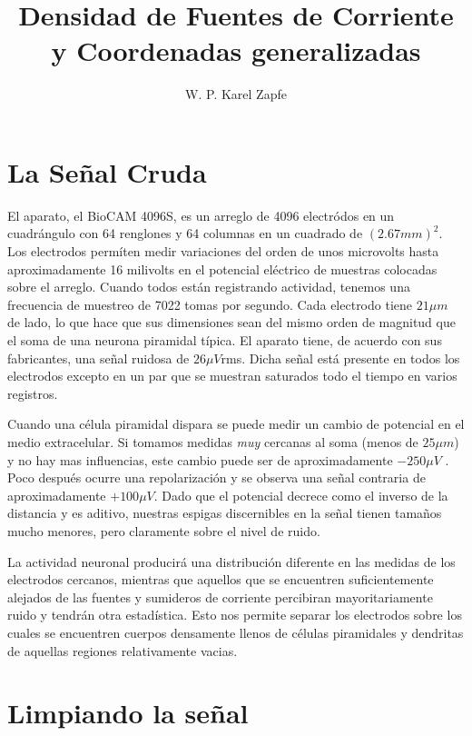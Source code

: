 \documentclass{article}
\title{Densidad de Fuentes de Corriente y Coordenadas generalizadas}
\author{W. P. Karel Zapfe}
\begin{document}
\maketitle

\section{La Señal Cruda}

El aparato, el BioCAM 4096S, es un arreglo de 4096 electródos en un 
cuadrángulo con 64 renglones y 64 columnas en un cuadrado de
$(2.67 mm)^2$. Los electrodos permíten medir variaciones del orden
de unos microvolts hasta aproximadamente 16 milivolts 
en el potencial eléctrico de muestras colocadas sobre el arreglo. Cuando
todos están registrando actividad, tenemos una frecuencia de muestreo
de 7022 tomas por segundo. Cada electrodo tiene $21 \mu m$ de lado, lo
que hace que sus dimensiones sean del mismo orden de magnitud que el 
soma de una neurona piramidal típica. El aparato tiene, de acuerdo
con sus fabricantes, una señal ruidosa de $26 \mu V$rms. Dicha señal
está presente en todos los electrodos excepto en un par que se
muestran saturados todo el tiempo en varios registros.

Cuando una célula piramidal dispara se puede medir un cambio de potencial
en el medio extracelular. Si tomamos medidas \emph{muy} cercanas al soma
(menos de $25 \mu m$)
y no hay mas influencias, este cambio puede ser de aproximadamente
$-250\mu V$ \cite{Obien2015}. Poco después ocurre una repolarización
y se observa una señal contraria de aproximadamente $+100\mu V$.
Dado que el potencial decrece como el inverso de la distancia
y es aditivo, nuestras espigas discernibles en la señal tienen tamaños mucho
menores, pero claramente sobre el nivel de ruido.

La actividad neuronal producirá una distribución diferente en las medidas
de los electrodos cercanos, mientras que aquellos que se encuentren
suficientemente alejados de las fuentes y sumideros de corriente
percibiran mayoritariamente ruido y tendrán otra estadística.
Esto nos permite separar los electrodos sobre los cuales
se encuentren cuerpos densamente llenos de células piramidales y dendritas
de aquellas regiones relativamente vacias. 



\section{Limpiando la señal}
\end{document}
